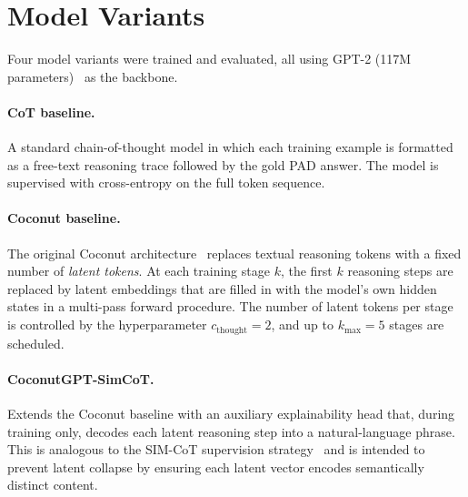 \documentclass[12pt,twoside]{report}
\begin{document}
\section{Model Variants}

Four model variants were trained and evaluated, all using GPT-2 (117M parameters)~\cite{radford2019language} as the backbone.

\paragraph{CoT baseline.}
A standard chain-of-thought model in which each training example is formatted as a free-text reasoning trace followed by the gold PAD answer.
The model is supervised with cross-entropy on the full token sequence.

\paragraph{Coconut baseline.}
The original Coconut architecture~\cite{hao2025traininglargelanguagemodels} replaces textual reasoning tokens with a fixed number of \emph{latent tokens}.
At each training stage $k$, the first $k$ reasoning steps are replaced by latent embeddings that are filled in with the model's own hidden states in a multi-pass forward procedure.
The number of latent tokens per stage is controlled by the hyperparameter $c_{\text{thought}} = 2$, and up to $k_{\max} = 5$ stages are scheduled.

\paragraph{CoconutGPT-SimCoT.}
Extends the Coconut baseline with an auxiliary explainability head that, during training only, decodes each latent reasoning step into a natural-language phrase.
This is analogous to the SIM-CoT supervision strategy~\cite{wei2025simcot} and is intended to prevent latent collapse by ensuring each latent vector encodes semantically distinct content.
\end{document}
